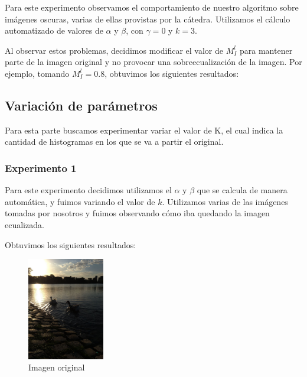 \documentclass[10pt, a4paper]{article}
\begin{document}
Para este experimento observamos el comportamiento de nuestro algoritmo sobre imágenes oscuras, varias de ellas provistas por la cátedra. Utilizamos el cálculo automatizado de valores de $\alpha$ y $\beta$, con $\gamma = 0$ y $k=3$.

Al observar estos problemas, decidimos modificar el valor de $M_{I}^l$ para mantener parte de la imagen original y no provocar una sobre\-ecualización de la imagen. Por ejemplo, tomando $M_{I}^l=0.8$, obtuvimos los siguientes resultados:



\subsection{Variación de parámetros}

Para esta parte buscamos experimentar variar el valor de K, el cual indica la cantidad de histogramas en los que se va a partir el original. 

\subsubsection{Experimento 1}

Para este experimento decidimos utilizamos el $\alpha$ y $\beta$ que se calcula de manera automática, y fuimos variando el valor de $k$. Utilizamos varias de las imágenes tomadas por nosotros y fuimos observando cómo iba quedando la imagen ecualizada.

Obtuvimos los siguientes resultados:

\begin{figure}[H]
	\centering
        \includegraphics[width=0.3\textwidth]{patitos1.jpg}
        \caption{Imagen original}
\end{figure}
\end{document}
